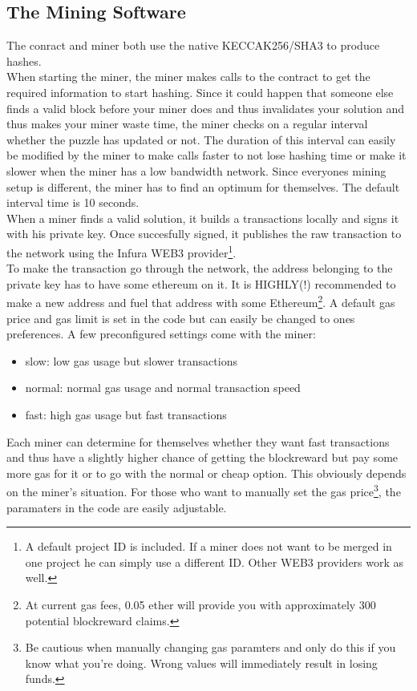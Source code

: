 \documentclass{article}
\begin{document}
\subsection{The Mining Software}
The conract and miner both use the native KECCAK256/SHA3 to produce hashes.\\
When starting the miner, the miner makes calls to the contract to get the required information to start hashing. Since it could happen that someone else finds a valid block before your miner does and thus invalidates your solution and thus makes your miner waste time, the miner checks on a regular interval whether the puzzle has updated or not. The duration of this interval can easily be modified by the miner to make calls faster to not lose hashing time or make it slower when the miner has a low bandwidth network. Since everyones mining setup is different, the miner has to find an optimum for themselves. The default interval time is 10 seconds.\\
When a miner finds a valid solution, it builds a transactions locally and signs it with his private key. Once succesfully signed, it publishes the raw transaction to the network using the Infura WEB3 provider\footnote{A default project ID is included. If a miner does not want to be merged in one project he can simply use a different ID. Other WEB3 providers work as well.}. \\
To make the transaction go through the network, the address belonging to the private key has to have some ethereum on it. It is HIGHLY(!) recommended to make a new address and fuel that address with some Ethereum\footnote{At current gas fees, 0.05 ether will provide you with approximately 300 potential blockreward claims.}.
A default gas price and gas limit is set in the code but can easily be changed to ones preferences. A few preconfigured settings come with the miner:
\begin{itemize}
\item slow: low gas usage but slower transactions
\item normal: normal gas usage and normal transaction speed
\item fast: high gas usage but fast transactions
\end{itemize}
Each miner can determine for themselves whether they want fast transactions and thus have a slightly higher chance of getting the blockreward but pay some more gas for it or to go with the normal or cheap option. This obviously depends on the miner's situation. For those who want to manually set the gas price\footnote{Be cautious when manually changing gas paramters and only do this if you know what you're doing. Wrong values will immediately result in losing funds.}, the paramaters in the code are easily adjustable.
\end{document}
